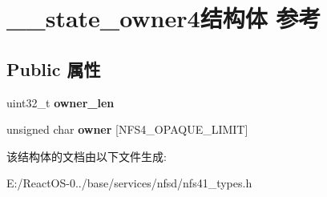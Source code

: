 \hypertarget{struct____state__owner4}{}\section{\+\_\+\+\_\+state\+\_\+owner4结构体 参考}
\label{struct____state__owner4}
\subsection*{Public 属性}
\begin{DoxyCompactItemize}
\item 
\mbox{\label{struct____state__owner4_ac91fa9f38d98c48c7e9602508e3e34b5}} 
uint32\+\_\+t {\bfseries owner\+\_\+len}
\item 
\mbox{\label{struct____state__owner4_a62889ee2624c990c778c488a4e2858ad}} 
unsigned char {\bfseries owner} \mbox{[}N\+F\+S4\+\_\+\+O\+P\+A\+Q\+U\+E\+\_\+\+L\+I\+M\+IT\mbox{]}
\end{DoxyCompactItemize}


该结构体的文档由以下文件生成\+:\begin{DoxyCompactItemize}
\item 
E\+:/\+React\+O\+S-\/0../base/services/nfsd/nfs41\+\_\+types.\+h\end{DoxyCompactItemize}
